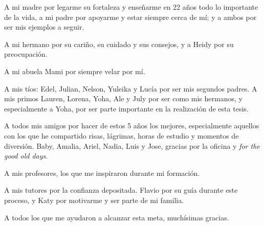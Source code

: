 \begin{acknowledgements}
	A mi madre por legarme su fortaleza y enseñarme en 22 años todo lo importante de la vida, a mi padre por apoyarme y estar siempre cerca de mí; y a ambos por ser mis ejemplos a seguir. 
	
	A mi hermano por su cariño, su cuidado y sus consejos, y a Heidy por su preocupación. 
	
	A mi abuela Mami por siempre velar por mí.
	
    A mis tíos: Edel, Julian, Nelson, Yuleika y Lucía por ser mis segundos padres. A mis primos Lauren, Lorena, Yoha, Ale y July por ser como mis hermanos, y especialmente a Yoha, por ser parte importante en la realización de esta tesis.
	 
	A todos mis amigos por hacer de estos 5 años los mejores, especialmente aquellos con los que he compartido risas, lágrimas, horas de estudio y momentos de diversión. Baby, Amalia, Ariel, Nadia, Luis y Jose, gracias por la oficina y \textit{for the good old days}.  
	
	A mis profesores, los que me inspiraron durante mi formación.
	
	A mis tutores por la confianza depositada. Flavio por su guía durante este proceso, y Katy por motivarme y ser parte de mi familia.
	
	A todos los que me ayudaron a alcanzar esta meta, muchísimas gracias.
	
	
	 
	
   
\end{acknowledgements}